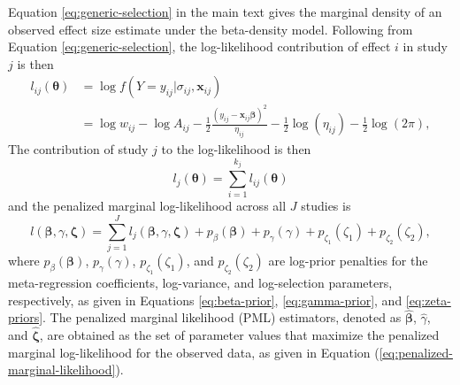 \documentclass[
  american,
  man, donotrepeattitle,floatsintext]{apa7}
\begin{document}
Equation \eqref{eq:generic-selection} in the main text gives the marginal density of an observed effect size estimate under the beta-density model. Following from Equation \eqref{eq:generic-selection}, the log-likelihood contribution of effect \(i\) in study \(j\) is then
\begin{align}
l_{ij}\left(\boldsymbol\theta \right) &= \log f\left(Y = y_{ij} | \sigma_{ij}, \mathbf{x}_{ij}\right) \nonumber \\
&= \log w_{ij} - \log A_{ij} - \frac{1}{2} \frac{\left(y_{ij} - \mathbf{x}_{ij} \boldsymbol\beta\right)^2}{\eta_{ij}} - \frac{1}{2}\log\left(\eta_{ij}\right) - \frac{1}{2}\log(2 \pi), \label{eq:log-lik-ij}
\end{align}
The contribution of study \(j\) to the log-likelihood is then
\begin{equation}
l_{j}\left(\boldsymbol\theta \right) = \sum_{i=1}^{k_j} l_{ij}\left(\boldsymbol\theta \right)
\end{equation}
and the penalized marginal log-likelihood across all \(J\) studies is
\begin{equation}
\label{eq:penalized-marginal-likelihood}
l\left(\boldsymbol\beta, \gamma, \boldsymbol\zeta \right) = \sum_{j=1}^{J} l_{j}\left(\boldsymbol\beta, \gamma, \boldsymbol\zeta \right) + p_{\beta}(\boldsymbol\beta) + p_{\gamma}(\gamma) + p_{\zeta_1}(\zeta_1) + p_{\zeta_2}(\zeta_2),
\end{equation}
where \(p_{\beta}(\boldsymbol\beta)\), \(p_{\gamma}(\gamma)\), \(p_{\zeta_1}(\zeta_1)\), and \(p_{\zeta_2}(\zeta_2)\) are log-prior penalties for the meta-regression coefficients, log-variance, and log-selection parameters, respectively, as given in Equations \eqref{eq:beta-prior}, \eqref{eq:gamma-prior}, and \eqref{eq:zeta-priors}.
The penalized marginal likelihood (PML) estimators, denoted as \(\boldsymbol{\hat\beta}\), \(\hat\gamma\), and \(\boldsymbol{\hat\zeta}\), are obtained as the set of parameter values that maximize the penalized marginal log-likelihood for the observed data, as given in Equation (\ref{eq:penalized-marginal-likelihood}).
\end{document}
